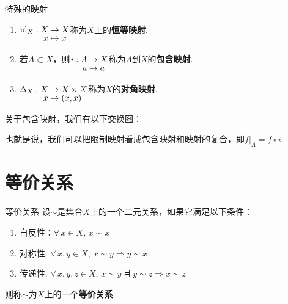 \begin{definition}{特殊的映射}
    \begin{enumerate}
        \item ${\setjot[-2]\begin{aligned}[t]
            \mathrm{id}_X: X &\to X \\
            x &\mapsto x
        \end{aligned}}$称为$X$上的\textbf{恒等映射}.
        \item 若$A\subset X$，则${\setjot[-2]\begin{aligned}[t]
            i:A &\to X \\
            a &\mapsto a
        \end{aligned}}$称为$A$到$X$的\textbf{包含映射}.
        \item $\setjot[-2]\begin{aligned}[t]
            \Delta_X:X &\to X\times X \\
            x &\mapsto (x,x)
        \end{aligned}$称为$X$的\textbf{对角映射}.
    \end{enumerate}
\end{definition}

\begin{remark}
    关于包含映射，我们有以下交换图： \par
    \begin{figure}
        \vspace{-2 em}
        \vspace{-2 em}
    \end{figure}
    \par

也就是说，我们可以把限制映射看成包含映射和映射的复合，即$f|_A=f\circ i$.

\end{remark}

\section{等价关系}

\begin{definition}{等价关系}
    设$\sim$是集合$X$上的一个二元关系，如果它满足以下条件：
    \begin{enumerate}
        \item 自反性：$\forall\, x\in X,\,x\sim x$
        \item 对称性: $\forall\, x,y\in X,\,x\sim y\Rightarrow y\sim x$
        \item 传递性: $\forall\, x,y,z\in X,\,x\sim y\,\text{且}\,y\sim z\Rightarrow x\sim z$
    \end{enumerate}
    则称$\sim$为$X$上的一个\textbf{等价关系}.
\end{definition}



